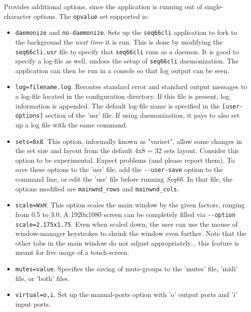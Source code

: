       Provides additional options, since the application is running out of
      single-character options.  The \texttt{opvalue} set supported is:
      \begin{itemize}
         \item \texttt{daemonize} and \texttt{no-daemonize}.
            Sets up the \texttt{seq66cli} application to fork to the background
            the \textsl{next time} it is run.
            This is done by modifying the \texttt{seq66cli.usr}
            file to specify that \texttt{seq66cli} runs as a daemon.
            It is good to specify a log-file as well.
            undoes the setup of \texttt{seq66cli} daemonization.
            The application can then be run in
            a console so that log output can be seen.
         \item \texttt{log=filename.log}.
            Reroutes standard error and standard
            output messages to a log-file located in
            the configuration directory.
            If this file is present, log information is appended.
            The default log-file name is specified in the
            \texttt{[user-options]} section of the 'usr' file.
            If using daemonization, it pays to also set up a log
            file with the same command.
         \item \texttt{sets=8x8}.
            This option, informally known as "variset", allow some changes in
            the set size and layout from the default 4x8 = 32 sets layout.
            Consider this option to be experimental.
            Expect problems (and please report them).
            To save these options to the 'usr' file, add the
            \texttt{-{}-user-save} option to the command line, or edit the
            'usr' file before running \textsl{Seq66}.
            In that file, the options modified are \texttt{mainwnd\_rows} and
            \texttt{mainwnd\_cols}.
         \item \texttt{scale=WxH}.
            This option scales the main window by the given factors,
            ranging from 0.5 to 3.0. A 1920x1080 screen can be completely
            filled via \texttt{-{}-option scale=2.175x1.75}. Even when scaled 
            down, the user can use the mouse of window-manager keystrokes to
            shrink the window even further.
            Note that the other tabs in the main window do not adjust
            appropriately... this feature is meant for live usage of
            a touch-screen.
         \item \texttt{mutes=value}. Specifies the saving of mute-groups
            to the 'mutes' file, 'midi' file, or 'both' files.
         \item \texttt{virtual=o,i}. Set up the manual-ports option with 'o'
            output ports and 'i' input ports.
      \end{itemize}

